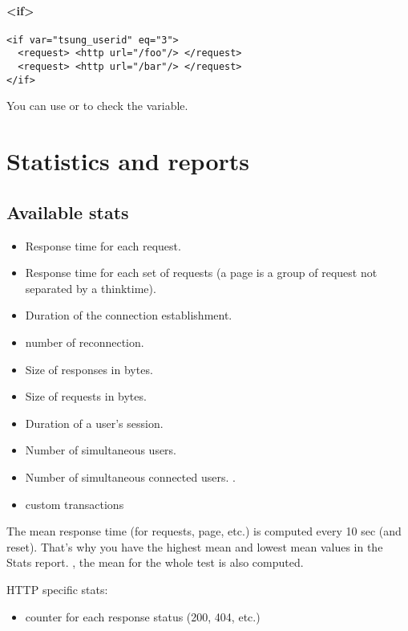 \documentclass{TSUNG-en}
\begin{document}
\paragraph{<if>}

\begin{Verbatim}
<if var="tsung_userid" eq="3">  
  <request> <http url="/foo"/> </request>
  <request> <http url="/bar"/> </request>
</if>
\end{Verbatim}

You can use  or  to check the variable.

\section{Statistics and reports}
\label{sec:statistics-reports}

\subsection{Available stats}

\begin{itemize}
\item  {} Response time for each request.
\item  {} Response time for each set of requests (a page is a group
  of request not separated by a thinktime).
\item  {} Duration of the connection establishment.
\item  {} number of reconnection.
\item  {} Size of responses in bytes.
\item  {} Size of requests in bytes.
\item  {} Duration of a user's session.
\item  {} Number of simultaneous users.
\item  {} Number of simultaneous connected users. .
\item  custom transactions
\end{itemize}

The mean response time (for requests, page, etc.) is computed every 10
sec (and reset). That's why you have the highest mean and lowest mean
values in the Stats report. , the mean for
the whole test is also computed.

HTTP specific stats:
\begin{itemize}
\item counter for each response status (200, 404, etc.)
\end{itemize}
\end{document}
